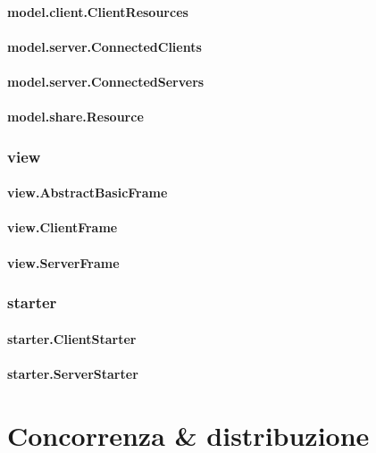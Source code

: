 \documentclass[
10pt, %
a4paper, %
oneside, %
BCOR5mm, %
]{scrartcl}
\begin{document}
 			\paragraph{model.client.ClientResources}

 			\paragraph{model.server.ConnectedClients}
 			\paragraph{model.server.ConnectedServers}

 			\paragraph{model.share.Resource}

 		\subsubsection{view}

 			\paragraph{view.AbstractBasicFrame}
 			\paragraph{view.ClientFrame}
 			\paragraph{view.ServerFrame}


 		\subsubsection{starter}

 			\paragraph{starter.ClientStarter}
 			\paragraph{starter.ServerStarter}


\section{Concorrenza \& distribuzione}
\end{document}
